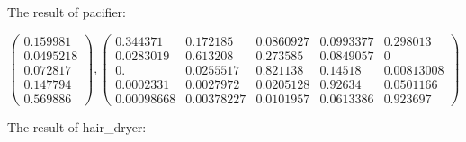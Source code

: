 \documentclass[12pt]{mcmthesis}
\begin{document}
\begin{itemize}
    The result of pacifier:
    
    $$\left.\left(\begin{array}{c}
    0.159981 \\
    0.0495218 \\
    0.072817 \\
    0.147794 \\
    0.569886
    \end{array}\right) , \left(\begin{array}{ccccc}
    	0.344371 & 0.172185 & 0.0860927 & 0.0993377 & 0.298013 \\
    	0.0283019 & 0.613208 & 0.273585 & 0.0849057 & 0 \\
    	0 . & 0.0255517 & 0.821138 & 0.14518 & 0.00813008 \\
    	0.0002331 & 0.0027972 & 0.0205128 & 0.92634 & 0.0501166 \\
    	0.00098668 & 0.00378227 & 0.0101957 & 0.0613386 & 0.923697
    \end{array}\right)\right.$$
    
    The result of hair\_dryer:
    

\end{itemize}
\end{document}
